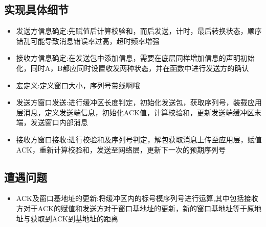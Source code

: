 \documentclass[UTF8,14pt]{article}
\numberwithin{figure}{section}
\begin{document}
\subsection{实现具体细节}
\begin{itemize}
      \setlength{\parskip}{-5mm}
      \item {发送方信息确定:\quad}先赋值后计算校验和，而后发送，计时，最后转换状态，顺序错乱可能导致消息错误率过高，超时频率增强\\
      \item {接收方信息确定:\quad}在发送包中添加信息，需要在底层同样增加信息的声明初始化，同时A，B都应同时设置收发两种状态，并在函数中进行发送方的确认\\
      \item {宏定义:\quad}定义窗口大小，序列号带线啊哦\\
      \item {发送方窗口发送:\quad}进行缓冲区长度判定，初始化发送包，获取序列号，装载应用层消息，定义发送端信息，初始化ACK值，计算校验和，更新发送端缓冲区末端，发送窗口内部消息\\
      \item {接收方窗口接收:\quad}进行校验和及序列号判定，解包获取消息上传至应用层，赋值ACK，重新计算校验和，发送至网络层，更新下一次的预期序列号\\
\end{itemize}
\subsection{遭遇问题}
\begin{itemize}
      \setlength{\parskip}{-5mm}
      \item {ACK及窗口基地址的更新:\quad}将缓冲区内的标号模序列号进行运算,其中包括接收方对于ACK的赋值和发送方对于窗口基地址的更新，新的窗口基地址等于原地址与获取到ACK到基地址的距离\\
\end{itemize}
\newpage
\end{document}
